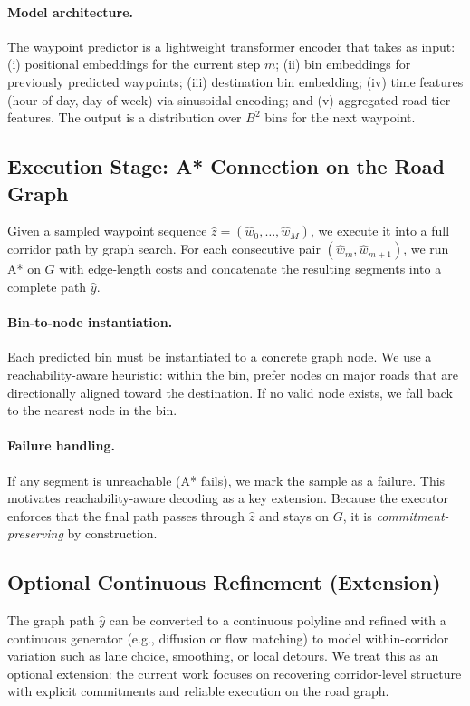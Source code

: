 \paragraph{Model architecture.}
The waypoint predictor is a lightweight transformer encoder that takes as input:
(i) positional embeddings for the current step $m$;
(ii) bin embeddings for previously predicted waypoints;
(iii) destination bin embedding;
(iv) time features (hour-of-day, day-of-week) via sinusoidal encoding; and
(v) aggregated road-tier features.
The output is a distribution over $B^2$ bins for the next waypoint.

\subsection{Execution Stage: A* Connection on the Road Graph}

Given a sampled waypoint sequence $\hat{z}=(\hat{w}_0,\dots,\hat{w}_M)$, we execute it into a full corridor path by graph search.
For each consecutive pair $(\hat{w}_{m},\hat{w}_{m+1})$, we run A* on $G$ with edge-length costs and concatenate the resulting segments into a complete path $\hat{y}$.

\paragraph{Bin-to-node instantiation.}
Each predicted bin must be instantiated to a concrete graph node.
We use a reachability-aware heuristic: within the bin, prefer nodes on major roads that are directionally aligned toward the destination.
If no valid node exists, we fall back to the nearest node in the bin.

\paragraph{Failure handling.}
If any segment is unreachable (A* fails), we mark the sample as a failure.
This motivates reachability-aware decoding as a key extension.
Because the executor enforces that the final path passes through $\hat{z}$ and stays on $G$, it is \emph{commitment-preserving} by construction.

\subsection{Optional Continuous Refinement (Extension)}

The graph path $\hat{y}$ can be converted to a continuous polyline and refined with a continuous generator (e.g., diffusion or flow matching) to model within-corridor variation such as lane choice, smoothing, or local detours.
We treat this as an optional extension: the current work focuses on recovering corridor-level structure with explicit commitments and reliable execution on the road graph.
